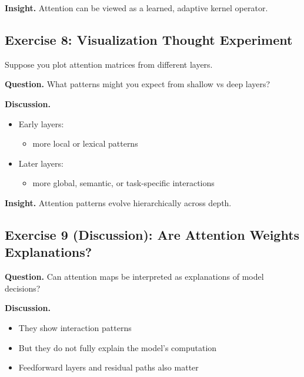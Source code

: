 \noindent
\textbf{Insight.}  
Attention can be viewed as a learned, adaptive kernel operator.

\subsection{Exercise 8: Visualization Thought Experiment}

Suppose you plot attention matrices from different layers.

\medskip

\noindent
\textbf{Question.}  
What patterns might you expect from shallow vs deep layers?

\medskip

\noindent
\textbf{Discussion.}

\begin{itemize}
    \item Early layers:
    \begin{itemize}
        \item more local or lexical patterns
    \end{itemize}

    \item Later layers:
    \begin{itemize}
        \item more global, semantic, or task-specific interactions
    \end{itemize}
\end{itemize}

\medskip

\noindent
\textbf{Insight.}  
Attention patterns evolve hierarchically across depth.

\subsection{Exercise 9 (Discussion): Are Attention Weights Explanations?}

\textbf{Question.}  
Can attention maps be interpreted as explanations of model decisions?

\medskip

\noindent
\textbf{Discussion.}

\begin{itemize}
    \item They show interaction patterns
    \item But they do not fully explain the model’s computation
    \item Feedforward layers and residual paths also matter
\end{itemize}

